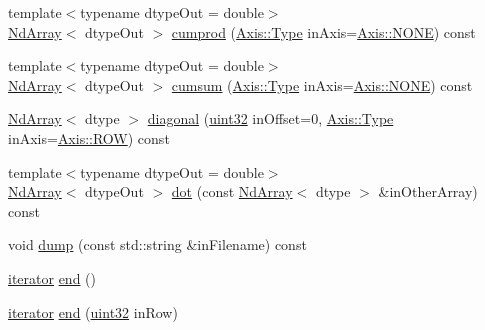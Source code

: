 \begin{DoxyCompactItemize}
\item 
{\footnotesize template$<$typename dtype\+Out  = double$>$ }\\\mbox{\hyperlink{class_num_c_1_1_nd_array}{Nd\+Array}}$<$ dtype\+Out $>$ \mbox{\hyperlink{class_num_c_1_1_nd_array_a2a963d6a129add991c1f0a7658a4cfd4}{cumprod}} (\mbox{\hyperlink{struct_num_c_1_1_axis_a8e689044ef1941a03482e730c5e7ebb3}{Axis\+::\+Type}} in\+Axis=\mbox{\hyperlink{struct_num_c_1_1_axis_a8e689044ef1941a03482e730c5e7ebb3a0ae033c4226f7184bf0050b101e7ed94}{Axis\+::\+N\+O\+NE}}) const
\item 
{\footnotesize template$<$typename dtype\+Out  = double$>$ }\\\mbox{\hyperlink{class_num_c_1_1_nd_array}{Nd\+Array}}$<$ dtype\+Out $>$ \mbox{\hyperlink{class_num_c_1_1_nd_array_a2124ddf2c54e5c2c59763c1010d7592d}{cumsum}} (\mbox{\hyperlink{struct_num_c_1_1_axis_a8e689044ef1941a03482e730c5e7ebb3}{Axis\+::\+Type}} in\+Axis=\mbox{\hyperlink{struct_num_c_1_1_axis_a8e689044ef1941a03482e730c5e7ebb3a0ae033c4226f7184bf0050b101e7ed94}{Axis\+::\+N\+O\+NE}}) const
\item 
\mbox{\hyperlink{class_num_c_1_1_nd_array}{Nd\+Array}}$<$ dtype $>$ \mbox{\hyperlink{class_num_c_1_1_nd_array_a96b353eeb4cf46de14b1ad1c277f5060}{diagonal}} (\mbox{\hyperlink{namespace_num_c_ae685802ca6d3035f2b400b081e3953fa}{uint32}} in\+Offset=0, \mbox{\hyperlink{struct_num_c_1_1_axis_a8e689044ef1941a03482e730c5e7ebb3}{Axis\+::\+Type}} in\+Axis=\mbox{\hyperlink{struct_num_c_1_1_axis_a8e689044ef1941a03482e730c5e7ebb3a392f74a34b6718b6d219cb2a08894feb}{Axis\+::\+R\+OW}}) const
\item 
{\footnotesize template$<$typename dtype\+Out  = double$>$ }\\\mbox{\hyperlink{class_num_c_1_1_nd_array}{Nd\+Array}}$<$ dtype\+Out $>$ \mbox{\hyperlink{class_num_c_1_1_nd_array_a8b557f69722874eceb23bae1ce11aa07}{dot}} (const \mbox{\hyperlink{class_num_c_1_1_nd_array}{Nd\+Array}}$<$ dtype $>$ \&in\+Other\+Array) const
\item 
void \mbox{\hyperlink{class_num_c_1_1_nd_array_a647c9f590512193ad0de8257b1143396}{dump}} (const std\+::string \&in\+Filename) const
\item 
\mbox{\hyperlink{class_num_c_1_1_nd_array_a49cd61f019d7106a40ffdb9c3ee98f08}{iterator}} \mbox{\hyperlink{class_num_c_1_1_nd_array_abe62fb75f8608717d211997f86d73735}{end}} ()
\item 
\mbox{\hyperlink{class_num_c_1_1_nd_array_a49cd61f019d7106a40ffdb9c3ee98f08}{iterator}} \mbox{\hyperlink{class_num_c_1_1_nd_array_a9d80422e72f05dc0af9945ee091ae261}{end}} (\mbox{\hyperlink{namespace_num_c_ae685802ca6d3035f2b400b081e3953fa}{uint32}} in\+Row)

\end{DoxyCompactItemize}
